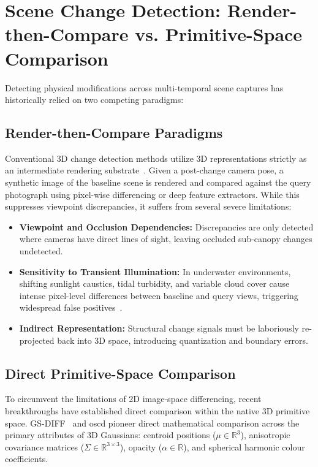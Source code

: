 \section{Scene Change Detection: Render-then-Compare vs. Primitive-Space Comparison}
\label{sec:lit_scd}
Detecting physical modifications across multi-temporal scene captures has historically relied on two competing paradigms:

\subsection{Render-then-Compare Paradigms}
Conventional 3D change detection methods utilize 3D representations strictly as an intermediate rendering substrate~\cite{10.1145/3806262.3806264}. Given a post-change camera pose, a synthetic image of the baseline scene is rendered and compared against the query photograph using pixel-wise differencing or deep feature extractors. While this suppresses viewpoint discrepancies, it suffers from several severe limitations:
\begin{itemize}
    \item \textbf{Viewpoint and Occlusion Dependencies:} Discrepancies are only detected where cameras have direct lines of sight, leaving occluded sub-canopy changes undetected.
    \item \textbf{Sensitivity to Transient Illumination:} In underwater environments, shifting sunlight caustics, tidal turbidity, and variable cloud cover cause intense pixel-level differences between baseline and query views, triggering widespread false positives~\cite{galappaththige2026pixelsprimitivesscenechange}.
    \item \textbf{Indirect Representation:} Structural change signals must be laboriously re-projected back into 3D space, introducing quantization and boundary errors.
\end{itemize}

\subsection{Direct Primitive-Space Comparison}
To circumvent the limitations of 2D image-space differencing, recent breakthroughs have established direct comparison within the native 3D primitive space. GS-DIFF~\cite{galappaththige2026pixelsprimitivesscenechange} and \gls{oscd} pioneer direct mathematical comparison across the primary attributes of 3D Gaussians: centroid positions ($\mu \in \mathbb{R}^3$), anisotropic covariance matrices ($\Sigma \in \mathbb{R}^{3 \times 3}$), opacity ($\alpha \in \mathbb{R}$), and spherical harmonic colour coefficients.

